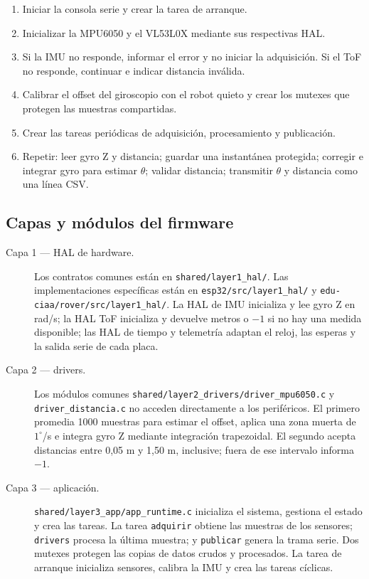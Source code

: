 \begin{enumerate}
  \item Iniciar la consola serie y crear la tarea de arranque.
  \item Inicializar la MPU6050 y el VL53L0X mediante sus respectivas HAL.
  \item Si la IMU no responde, informar el error y no iniciar la adquisición.
        Si el ToF no responde, continuar e indicar distancia inválida.
  \item Calibrar el offset del giroscopio con el robot quieto y crear los
        mutexes que protegen las muestras compartidas.
  \item Crear las tareas periódicas de adquisición, procesamiento y publicación.
  \item Repetir: leer gyro Z y distancia; guardar una instantánea protegida;
        corregir e integrar gyro para estimar $\theta$; validar distancia;
        transmitir $\theta$ y distancia como una línea CSV.
\end{enumerate}

\subsection{Capas y módulos del firmware}

\begin{description}
  \item[Capa 1 --- HAL de hardware.] Los contratos comunes están en
        \texttt{shared/layer1\_hal/}. Las implementaciones específicas están en
        \texttt{esp32/src/layer1\_hal/} y
        \texttt{edu-ciaa/rover/src/layer1\_hal/}. La HAL de IMU inicializa y lee
        gyro Z en rad/s; la HAL ToF inicializa y devuelve metros o $-1$ si no hay
        una medida disponible; las HAL de tiempo y telemetría adaptan el reloj,
        las esperas y la salida serie de cada placa.
  \item[Capa 2 --- drivers.] Los módulos comunes
        \texttt{shared/layer2\_drivers/driver\_mpu6050.c} y
        \texttt{driver\_distancia.c} no acceden directamente a los periféricos.
        El primero promedia 1000 muestras para estimar el offset, aplica una
        zona muerta de $1^\circ$/s e integra gyro Z mediante integración
        trapezoidal. El segundo acepta distancias entre 0,05 m y 1,50 m,
        inclusive; fuera de ese intervalo informa $-1$.
  \item[Capa 3 --- aplicación.] \texttt{shared/layer3\_app/app\_runtime.c}
        inicializa el sistema, gestiona el estado y crea las tareas. La tarea
        \texttt{adquirir} obtiene las muestras de los sensores; \texttt{drivers}
        procesa la última muestra; y \texttt{publicar} genera la trama serie.
        Dos mutexes protegen las copias de datos crudos y procesados. La tarea
        de arranque inicializa sensores, calibra la IMU y crea las tareas
        cíclicas.
\end{description}


